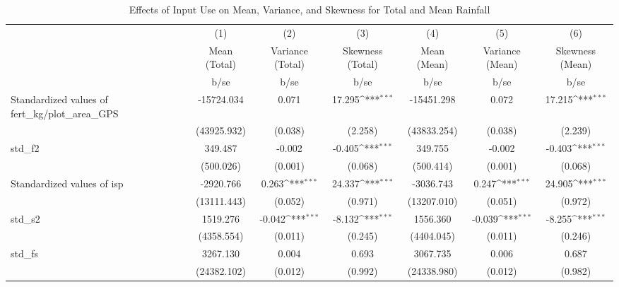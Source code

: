 \begin{table}[htbp]\centering
\def\sym#1{\ifmmode^{#1}\else\(^{#1}\)\fi}
\caption{Effects of Input Use on Mean, Variance, and Skewness for Total and Mean Rainfall}
\begin{tabular}{l*{6}{c}}
\toprule
                &\multicolumn{1}{c}{(1)}&\multicolumn{1}{c}{(2)}&\multicolumn{1}{c}{(3)}&\multicolumn{1}{c}{(4)}&\multicolumn{1}{c}{(5)}&\multicolumn{1}{c}{(6)}\\
                &\multicolumn{1}{c}{Mean (Total)}&\multicolumn{1}{c}{Variance (Total)}&\multicolumn{1}{c}{Skewness (Total)}&\multicolumn{1}{c}{Mean (Mean)}&\multicolumn{1}{c}{Variance (Mean)}&\multicolumn{1}{c}{Skewness (Mean)}\\
                &     b/se         &     b/se         &     b/se         &     b/se         &     b/se         &     b/se         \\
\midrule
Standardized values of fert\_kg/plot\_area\_GPS&-15724.034         &    0.071         &   17.295\sym{***}&-15451.298         &    0.072         &   17.215\sym{***}\\
                &(43925.932)         &  (0.038)         &  (2.258)         &(43833.254)         &  (0.038)         &  (2.239)         \\
std\_f2          &  349.487         &   -0.002         &   -0.405\sym{***}&  349.755         &   -0.002         &   -0.403\sym{***}\\
                &(500.026)         &  (0.001)         &  (0.068)         &(500.414)         &  (0.001)         &  (0.068)         \\
Standardized values of isp&-2920.766         &    0.263\sym{***}&   24.337\sym{***}&-3036.743         &    0.247\sym{***}&   24.905\sym{***}\\
                &(13111.443)         &  (0.052)         &  (0.971)         &(13207.010)         &  (0.051)         &  (0.972)         \\
std\_s2          & 1519.276         &   -0.042\sym{***}&   -8.132\sym{***}& 1556.360         &   -0.039\sym{***}&   -8.255\sym{***}\\
                &(4358.554)         &  (0.011)         &  (0.245)         &(4404.045)         &  (0.011)         &  (0.246)         \\
std\_fs          & 3267.130         &    0.004         &    0.693         & 3067.735         &    0.006         &    0.687         \\
                &(24382.102)         &  (0.012)         &  (0.992)         &(24338.980)         &  (0.012)         &  (0.982)         \\

\end{tabular}
\end{table}
